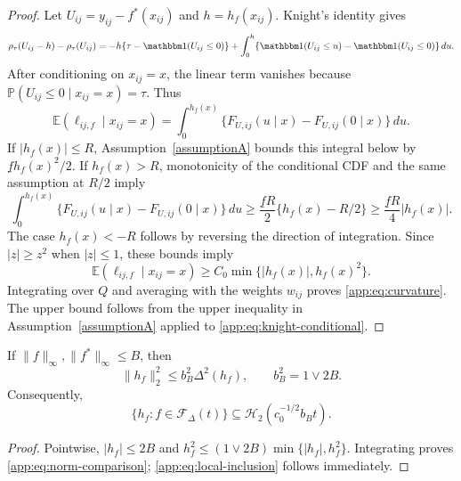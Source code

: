\documentclass[twoside,11pt]{article}
\newenvironment{revision}{\color{revisionred}}{}
\begin{document}
\begin{revision}
\begin{proof}
Let $U_{ij}=y_{ij}-f^*(x_{ij})$ and $h=h_f(x_{ij})$.  Knight's identity gives
\[
 \rho_\tau(U_{ij}-h)-\rho_\tau(U_{ij})
 =-h\{\tau-\mathbbm 1(U_{ij}\le0)\}
   +\int_0^h\{\mathbbm 1(U_{ij}\le u)-\mathbbm 1(U_{ij}\le0)\}\,du.
\]
After conditioning on $x_{ij}=x$, the linear term vanishes because
$\mathbb P(U_{ij}\le0\mid x_{ij}=x)=\tau$.  Thus
\begin{equation}
 \mathbb E(\ell_{ij,f}\mid x_{ij}=x)
 =\int_0^{h_f(x)}
 \{F_{U,ij}(u\mid x)-F_{U,ij}(0\mid x)\}\,du.                  \label{app:eq:knight-conditional}
\end{equation}
If $|h_f(x)|\le R$, Assumption~\ref{assumptionA} bounds this integral below by
$\underline f h_f(x)^2/2$.  If $h_f(x)>R$, monotonicity of the conditional CDF
and the same assumption at $R/2$ imply
\[
 \int_0^{h_f(x)}\{F_{U,ij}(u\mid x)-F_{U,ij}(0\mid x)\}\,du
 \ge \frac{\underline f R}{2}\{h_f(x)-R/2\}
 \ge \frac{\underline f R}{4}|h_f(x)|.
\]
The case $h_f(x)<-R$ follows by reversing the direction of integration.  Since
$|z|\ge z^2$ when $|z|\le1$, these bounds imply
\[
 \mathbb E(\ell_{ij,f}\mid x_{ij}=x)
 \ge C_0\min\{|h_f(x)|,h_f(x)^2\}.
\]
Integrating over $Q$ and averaging with the weights $w_{ij}$ proves
\eqref{app:eq:curvature}.  The upper bound follows from the upper inequality in
Assumption~\ref{assumptionA} applied to \eqref{app:eq:knight-conditional}.
\end{proof}

\begin{lemma}
\label{app:lem:norm-comparison}
If $\|f\|_\infty,\|f^*\|_\infty\le B$, then
\begin{equation}
  \|h_f\|_2^2\le b_B^2\Delta^2(h_f),
  \qquad b_B^2=1\vee 2B.                                      \label{app:eq:norm-comparison}
\end{equation}
Consequently,
\begin{equation}
  \{h_f:f\in\mathcal F_\Delta(t)\}
  \subseteq \mathcal H_2(c_0^{-1/2}b_Bt).                     \label{app:eq:local-inclusion}
\end{equation}
\end{lemma}

\begin{proof}
Pointwise, $|h_f|\le2B$ and
$h_f^2\le(1\vee2B)\min\{|h_f|,h_f^2\}$.  Integrating proves
\eqref{app:eq:norm-comparison}; \eqref{app:eq:local-inclusion} follows
immediately.
\end{proof}


\end{revision}
\end{document}
